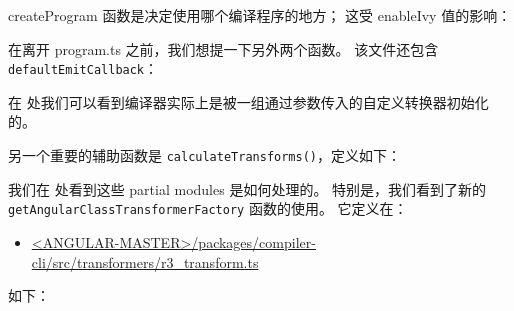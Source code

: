 


createProgram 函数是决定使用哪个编译程序的地方；
这受 enableIvy 值的影响：




在离开 program.ts 之前，我们想提一下另外两个函数。
该文件还包含 \texttt{defaultEmitCallback}：




在  处我们可以看到编译器实际上是被一组通过参数传入的自定义转换器初始化的。


另一个重要的辅助函数是 \texttt{calculateTransforms()}，定义如下：




我们在  处看到这些 partial modules 是如何处理的。
特别是，我们看到了新的 \texttt{getAngularClassTransformerFactory}
函数的使用。
它定义在：

\begin{itemize}
  \item \href{https://github.com/angular/angular/blob/c8a1a14b87e5907458e8e87021e47f9796cb3257/packages/compiler-cli/src/transformers/r3_transform.ts}
        {<ANGULAR-MASTER>/packages/compiler-cli/src/transformers/r3\_transform.ts}
\end{itemize}


如下：




